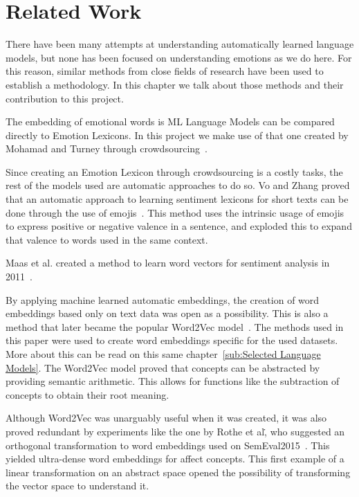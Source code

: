 \chapter{Related Work}\label{chap:Related Work}

There have been many attempts at understanding automatically learned language models, but none has been focused on understanding emotions as we do here. For this reason, similar methods from close fields of research have been used to establish a methodology. In this chapter we talk about those methods and their contribution to this project.

The embedding of emotional words is ML Language Models can be compared directly to Emotion Lexicons. In this project we make use of that one created by Mohamad and Turney through crowdsourcing~\cite{mohammad2013crowdsourcing}.


Since creating an Emotion Lexicon through crowdsourcing is a costly tasks, the rest of the models used are automatic approaches to do so. Vo and Zhang proved that an automatic approach to learning sentiment lexicons for short texts can be done through the use of emojis~\cite{vo2016count}. This method uses the intrinsic usage of emojis to express positive or negative valence in a sentence, and exploded this to expand that valence to words used in the same context.

Maas et al. created a method to learn word vectors for sentiment analysis in 2011~\cite{maas2011learning}.

By applying machine learned automatic embeddings, the creation of word embeddings based only on text data was open as a possibility. This is also a method that later became the popular Word2Vec model~\cite{mikolov2013word2vec}. The methods used in this paper were used to create word embeddings specific for the used datasets. More about this can be read on this same chapter~\ref{sub:Selected Language Models}. The Word2Vec model proved that concepts can be abstracted by providing semantic arithmetic. This allows for functions like the subtraction of concepts to obtain their root meaning.

Although Word2Vec was unarguably useful when it was created, it was also proved redundant by experiments like the one by Rothe et al\., who suggested an orthogonal transformation to word embeddings used on SemEval2015~\cite{rothe2016orthogonal}. This yielded ultra-dense word embeddings for affect concepts. This first example of a linear transformation on an abstract space opened the possibility of transforming the vector space to understand it.

